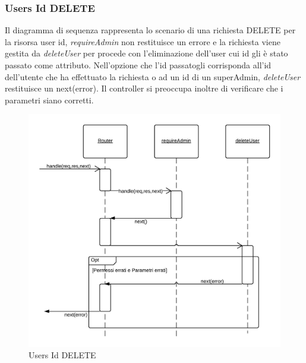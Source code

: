 \subsubsection{Users Id DELETE} 
Il diagramma di sequenza rappresenta lo scenario di una richiesta DELETE per la risorsa user id, \emph{requireAdmin} non restituisce un errore e la richiesta viene gestita da \emph{deleteUser} per procede con l'eliminazione dell'user cui id gli è stato passato come attributo.
Nell'opzione che l'id passatogli corrisponda all'id dell'utente che ha effettuato la richiesta o ad un id di un superAdmin, \emph{deleteUser} restituisce un next(error). Il controller si preoccupa inoltre di verificare che i parametri siano corretti.
\begin{figure}[H]
	\begin{center} 
		\includegraphics[scale=0.20]{scenari/Users Id DELETE.png} 
		\caption{Users Id DELETE}
	\end{center} 
\end{figure}

